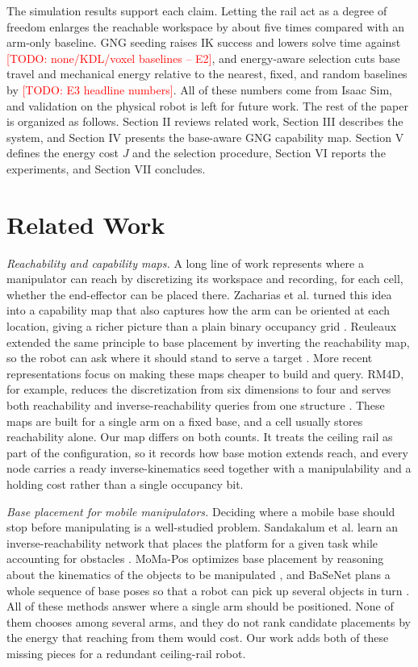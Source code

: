 \documentclass[conference]{IEEEtran}
\newcommand{\TODO}[1]{\textcolor{red}{[TODO: #1]}}
\begin{document}
The simulation results support each claim. Letting the rail act as a degree of
freedom enlarges the reachable workspace by about five times compared with an
arm-only baseline. GNG seeding raises IK success and lowers solve time against
\TODO{none/KDL/voxel baselines -- E2}, and energy-aware selection cuts base travel
and mechanical energy relative to the nearest, fixed, and random baselines by
\TODO{E3 headline numbers}. All of these numbers come from Isaac Sim, and
validation on the physical robot is left for future work. The rest of the paper is
organized as follows. Section II reviews related work, Section III describes the
system, and Section IV presents the base-aware GNG capability map. Section V
defines the energy cost $J$ and the selection procedure, Section VI reports the
experiments, and Section VII concludes.

\section{Related Work}

\noindent\textit{Reachability and capability maps.}
A long line of work represents where a manipulator can reach by discretizing its
workspace and recording, for each cell, whether the end-effector can be placed
there. Zacharias et al. turned this idea into a capability map that also captures
how the arm can be oriented at each location, giving a richer picture than a plain
binary occupancy grid \cite{Zacharias2007}. Reuleaux extended the same principle to
base placement by inverting the reachability map, so the robot can ask where it
should stand to serve a target \cite{Makhal2018}. More recent representations focus
on making these maps cheaper to build and query. RM4D, for example, reduces the
discretization from six dimensions to four and serves both reachability and
inverse-reachability queries from one structure \cite{RM4D2024}. These maps are
built for a single arm on a fixed base, and a cell usually stores reachability
alone. Our map differs on both counts. It treats the ceiling rail as part of the
configuration, so it records how base motion extends reach, and every node carries
a ready inverse-kinematics seed together with a manipulability and a holding cost
rather than a single occupancy bit.

\noindent\textit{Base placement for mobile manipulators.}
Deciding where a mobile base should stop before manipulating is a well-studied
problem. Sandakalum et al. learn an inverse-reachability network that places the
platform for a given task while accounting for obstacles \cite{InvReach2022}.
MoMa-Pos optimizes base placement by reasoning about the kinematics of the objects
to be manipulated \cite{MoMaPos2024}, and BaSeNet plans a whole sequence of base
poses so that a robot can pick up several objects in turn \cite{BaSeNet2024}. All of
these methods answer where a single arm should be positioned. None of them chooses
among several arms, and they do not rank candidate placements by the energy that
reaching from them would cost. Our work adds both of these missing pieces for a
redundant ceiling-rail robot.
\end{document}
